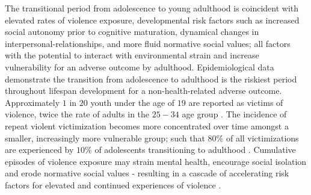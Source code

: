 \documentclass[utf8]{frontiersSCNS} %
\begin{document}
The transitional period from adolescence to young adulthood is coincident with elevated rates of violence exposure, developmental risk factors such as increased social autonomy prior to cognitive maturation, dynamical changes in interpersonal-relationships, and more fluid normative social values; all factors with the potential to interact with environmental strain and increase vulnerability for an adverse outcome by adulthood. Epidemiological data demonstrate the transition from adolescence to adulthood is the riskiest period throughout lifespan development for a non-health-related adverse outcome. Approximately $1$ in $20$ youth under the age of $19$ are reported as victims of violence, twice the rate of adults in the $25-34$ age group \citep{maguire2004sourcebook}. The incidence of repeat violent victimization becomes more concentrated over time amongst a smaller, increasingly more vulnerable group; such that $80\%$ of all victimizations are experienced by $10\%$ of adolescents transitioning to adulthood \citep{menard2000normality,farrell2001repeat}. Cumulative episodes of violence exposure may strain mental health, encourage social isolation and erode normative social values - resulting in a cascade of accelerating risk factors for elevated and continued experiences of violence \citep{farrell2001repeat}. 
\end{document}
